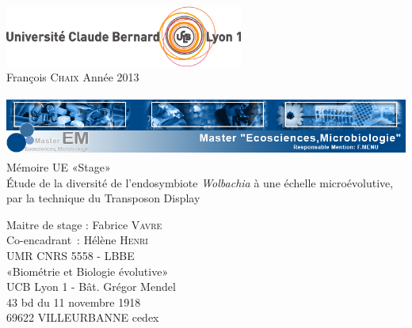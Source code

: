 \documentclass[a4paper, 12pt, oneside]{article}
\begin{document}
\pagestyle{empty} %

\setcounter{page}{0} %
 
\hfill
\includegraphics[height=2cm]{logo.eps}\\

\LARGE François \textsc{Chaix} \hfill Année 2013


 
\vspace{2cm}
 
 
\begin{center}
\includegraphics[height=2cm]{bandeau-portail.jpg}
\vspace{1cm}
\Huge Mémoire UE «Stage»\\
\vspace{1cm}
\Huge Étude de la diversité de l’endosymbiote \textit{Wolbachia} à une échelle microévolutive, par la technique du Transposon Display
\end{center}

\vfill
\noindent %
\Large Maitre de stage : Fabrice \textsc{Vavre}\\
Co-encadrant~: Hélène \textsc{Henri}\\

\vfill
\vspace{1cm}
\noindent
UMR CNRS 5558 - LBBE\\
«Biométrie et Biologie évolutive»\\
UCB Lyon 1  - Bât. Grégor Mendel\\
43 bd du 11 novembre 1918\\
69622 VILLEURBANNE cedex\\
\end{document}
